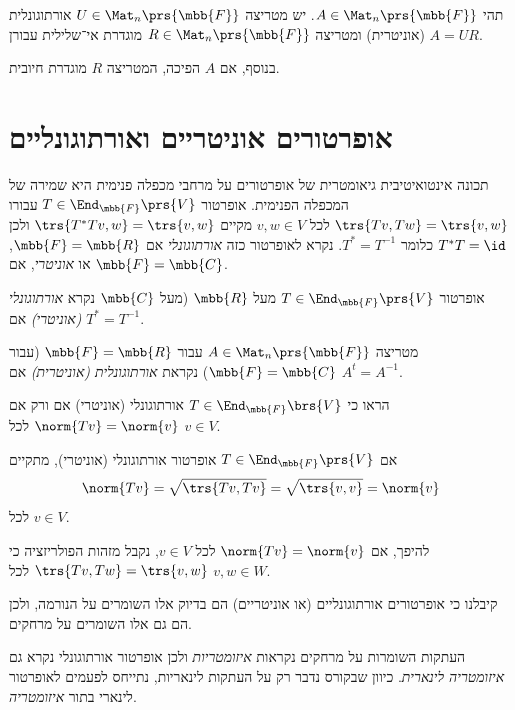 \documentclass[a4paper,10pt,twoside,openany]{book}
\begin{document}
\begin{theorem}
תהי
$A \in \Mat_n\prs{\mbb{F}}$.
יש מטריצה
$U \in \Mat_n\prs{\mbb{F}}$
אורתוגונלית (אוניטרית) ומטריצה
$R \in \Mat_n\prs{\mbb{F}}$
מוגדרת אי־‏שלילית עבורן
$A = UR$.

בנוסף,
אם
$A$
הפיכה, המטריצה
$R$
מוגדרת חיובית.
\end{theorem}

\section{אופרטורים אוניטריים ואורתוגונליים}

תכונה אינטואיטיבית גיאומטרית של אופרטורים על מרחבי מכפלה פנימית היא שמירה של המכפלה הפנימית.
אופרטור
$T \in \End_{\mbb{F}}\prs{V}$
עבורו
$\trs{Tv, Tw} = \trs{v,w}$
לכל
$v,w \in V$
מקיים
$\trs{T^* T v, w} = \trs{v,w}$
ולכן
$T^* T = \id$
כלומר
$T^* = T^{-1}$.
נקרא לאופרטור כזה
\emph{אורתוגונלי}
אם
$\mbb{F} = \mbb{R}$,
או
\emph{אוניטרי},
אם
$\mbb{F} = \mbb{C}$.

\begin{definition}
אופרטור
$T \in \End_{\mbb{F}}\prs{V}$
מעל
$\mbb{R}$
(מעל
$\mbb{C}$
נקרא
\emph{אורתוגונלי (אוניטרי)}
אם
$T^* = T^{-1}$.
\end{definition}

\begin{definition}
מטריצה
$A \in \Mat_n\prs{\mbb{F}}$
עבור
$\mbb{F} = \mbb{R}$
(עבור
$\mbb{F} = \mbb{C}$)
נקראת
\emph{אורתוגונלית (אוניטרית)}
אם
$A^t = A^{-1}$.
\end{definition}

\begin{exercisechap}
הראו כי
$T \in \End_{\mbb{F}}\brs{V}$
אורתוגונלי (אוניטרי) אם ורק אם
$\norm{Tv} = \norm{v}$
לכל
$v \in V$.
\end{exercisechap}

\begin{solution}
אם
$T \in \End_{\mbb{F}}\prs{V}$
אופרטור אורתוגונלי (אוניטרי), מתקיים
\[\norm{Tv} = \sqrt{\trs{Tv, Tv}} = \sqrt{\trs{v,v}} = \norm{v}\]
לכל
$v \in V$.

להיפך, אם
$\norm{Tv} = \norm{v}$
לכל
$v \in V$,
נקבל מזהות הפולריזציה כי
$\trs{Tv, Tw} = \trs{v,w}$
לכל
$v,w \in W$.
\end{solution}

\begin{remark}
קיבלנו כי אופרטורים אורתוגונליים (או אוניטריים) הם בדיוק אלו השומרים על הנורמה, ולכן הם גם אלו השומרים על מרחקים.

העתקות השומרות על מרחקים נקראות
\emph{איזומטריות}
ולכן אופרטור אורתוגונלי נקרא גם
\emph{איזומטריה לינארית}.
כיוון שבקורס נדבר רק על העתקות לינאריות, נתייחס לפעמים לאופרטור לינארי בתור
\emph{איזומטריה}.
\end{remark}
\end{document}
